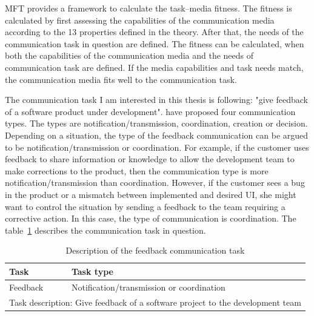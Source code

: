 \documentclass[english,12pt,a4paper,pdftex]{article}
\begin{document}
\ac{MFT} provides a framework to calculate the task--media fitness. The fitness is calculated by first assessing the capabilities of the communication media according to the 13 properties defined in the theory. After that, the needs of the communication task in question are defined. The fitness can be calculated, when both the capabilities of the communication media and the needs of communication task are defined. If the media capabilities and task needs match, the communication media fits well to the communication task.

The communication task I am interested in this thesis is following: "give feedback of a software product under development". \citet{nakamura1995} have proposed four communication types. The types are notification/transmission, coordination, creation or decision. Depending on a situation, the type of the feedback communication can be argued to be notification/transmission or coordination. For example, if the customer uses feedback to share information or knowledge to allow the development team to make corrections to the product, then the communication type is more notification/transmission than coordination. However, if the customer sees a bug in the product or a mismatch between implemented and desired \acl{UI}, she might want to control the situation by sending a feedback to the team requiring a corrective action. In this case, the type of communication is coordination. The table~\ref{table:description_feedback_communication_task} describes the communication task in question.

\begin{table}[!h]
\renewcommand{\arraystretch}{1.3}
\caption{Description of the feedback communication task}
\label{table:description_feedback_communication_task}
\centering
\begin{tabular}{|p{7cm}|p{7cm}|}
\hline
\textbf{Task} & \textbf{Task type}\\
\hline
Feedback & Notification/transmission or coordination\\
\hline
\multicolumn{2}{|l|}{Task description:
Give feedback of a software project to the development team} \\ \hline
\end{tabular}
\end{table}
\end{document}
